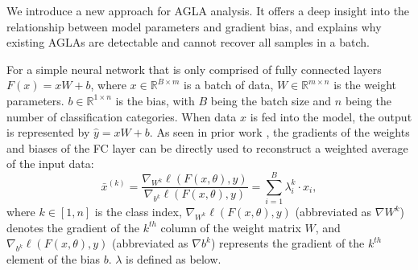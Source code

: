 We introduce a new approach for AGLA analysis. It
offers a deep insight into the relationship between model parameters and gradient bias, and explains why existing AGLAs are detectable and cannot recover all samples in a batch. 

For a simple neural network that is only comprised of fully connected layers $F(x)=xW+b$, where $x\in\mathbb{R}^{B\times m}$ is a batch of data, $W\in\mathbb{R}^{m \times n}$ is the weight parameters. $b\in\mathbb{R}^{1 \times n}$ is the bias, with $B$ being the batch size and $n$ being the number of classification categories. When data $x$ is fed into the model, the output is represented by $\hat{y}=xW+b$. 
As seen in prior work \cite{fowl2021robbing}, the gradients of the weights and biases of the FC layer can be directly used to reconstruct a weighted average of the input data:
\begin{equation}
\label{avgx}
    \bar{x}^{(k)}=\frac{\nabla_{W^k}\ell(F(x,\theta),y)}{\nabla_{b^k}\ell(F(x,\theta),y)}=\sum_{i=1}^B\lambda_i^k\cdot x_i,
\end{equation}
where $k\in[1,n]$ is the class index, $\nabla_{W^k}\ell(F(x,\theta),y)$ (abbreviated as $\nabla W^{k}$) denotes the gradient of the $k^{th}$ column of the weight matrix $W$, and $\nabla_{b^k}\ell(F(x,\theta),y)$ (abbreviated as $\nabla b^{k}$) represents the gradient of the $k^{th}$ element of the bias $b$. 
$\lambda$ is defined as below.

